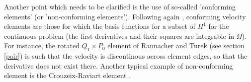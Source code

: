 Another point which needs to be clarified is the use of so-called 'conforming elements' 
(or 'non-conforming elements').  
Following again \cite{grsa}, conforming velocity elements are those for which the basis functions for a subset 
of $H^1$ for the continuous problem (the first derivatives and their squares are integrable in $\Omega$).
For instance, the rotated $Q_1 \times P_0$ element of Rannacher and Turek (see section \ref{pair}) is such that 
the velocity is discontinous across element edges, so that the derivative does not exist there. Another
typical example of non-conforming element is the Crouzeix-Raviart element \cite{crra73}.

 



